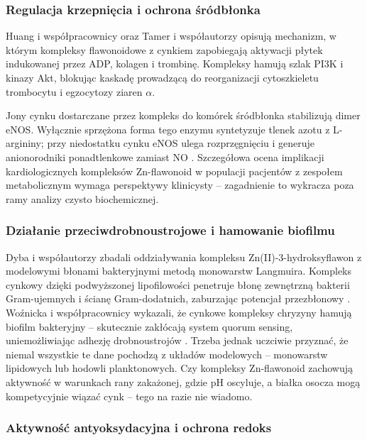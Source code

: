 \documentclass[12pt,a4paper]{article}
\begin{document}
\subsubsection{Regulacja krzepnięcia i ochrona śródbłonka}

Huang i współpracownicy \cite{huang2021} oraz Tamer i współautorzy \cite{tamer2022} opisują mechanizm, w którym kompleksy flawonoidowe z cynkiem zapobiegają aktywacji płytek indukowanej przez ADP, kolagen i trombinę. Kompleksy hamują szlak PI3K i kinazy Akt, blokując kaskadę prowadzącą do reorganizacji cytoszkieletu trombocytu i egzocytozy ziaren $\alpha$.

Jony cynku dostarczane przez kompleks do komórek śródbłonka stabilizują dimer eNOS. Wyłącznie sprzężona forma tego enzymu syntetyzuje tlenek azotu z L-argininy; przy niedostatku cynku eNOS ulega rozprzęgnięciu i generuje anionorodniki ponadtlenkowe zamiast NO \cite{costa2023, yang2022}. Szczegółowa ocena implikacji kardiologicznych kompleksów Zn-flawonoid w populacji pacjentów z zespołem metabolicznym wymaga perspektywy klinicysty -- zagadnienie to wykracza poza ramy analizy czysto biochemicznej.

\subsubsection{Działanie przeciwdrobnoustrojowe i hamowanie biofilmu}

Dyba i współautorzy \cite{dyba2025} zbadali oddziaływania kompleksu Zn(II)-3-hydroksyflawon z modelowymi błonami bakteryjnymi metodą monowarstw Langmuira. Kompleks cynkowy dzięki podwyższonej lipofilowości penetruje błonę zewnętrzną bakterii Gram-ujemnych i ścianę Gram-dodatnich, zaburzając potencjał przezbłonowy \cite{bamigboye2020}. Woźnicka i współpracownicy \cite{woznicka2025} wykazali, że cynkowe kompleksy chryzyny hamują biofilm bakteryjny -- skutecznie zakłócają system quorum sensing, uniemożliwiając adhezję drobnoustrojów \cite{wang2021}. Trzeba jednak uczciwie przyznać, że niemal wszystkie te dane pochodzą z układów modelowych -- monowarstw lipidowych lub hodowli planktonowych. Czy kompleksy Zn-flawonoid zachowują aktywność w warunkach rany zakażonej, gdzie pH oscyluje, a białka osocza mogą kompetycyjnie wiązać cynk -- tego na razie nie wiadomo.

\subsubsection{Aktywność antyoksydacyjna i ochrona redoks}
\end{document}

